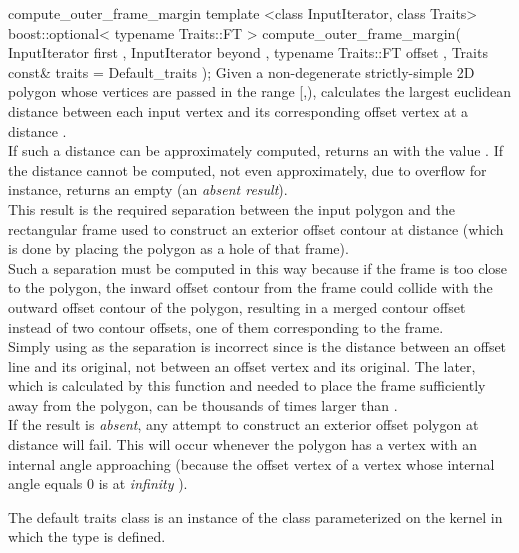 \begin{ccRefFunction}{compute_outer_frame_margin}
\ccFunction
{template <class InputIterator, class Traits>
boost::optional< typename Traits::FT >
compute_outer_frame_margin( InputIterator       first
                          , InputIterator       beyond
                          , typename Traits::FT offset
                          , Traits const&       traits = Default_traits
                          );
} 
{Given a non-degenerate strictly-simple 2D polygon whose vertices are passed 
in the range [,), calculates the largest euclidean distance
 between each input vertex and its corresponding offset vertex at
a distance .\\
If such a distance can be approximately computed, returns an  with the value . If the distance cannot be computed, not even approximately, due to overflow for instance, returns an empty  (an {\em absent result}).\\
This result is the required separation between the input polygon
and the rectangular frame used to construct an exterior offset contour
at distance  (which is done by placing the polygon as a hole of that frame).\\
Such a separation must be computed in this way because if the frame is 
too close to the polygon, the inward offset contour from the frame could
collide with the outward offset contour of the polygon, resulting in a merged
contour offset instead of two contour offsets, one of them corresponding to the frame.\\
Simply using  as the separation is incorrect since  is the distance 
between an offset line and its original, not between an offset vertex and its original.
The later, which is calculated by this function and needed to place the frame sufficiently
away from the polygon, can be thousands of times larger than .\\
If the result is {\em absent}, any attempt to construct an exterior offset polygon at distance  will fail. This will occur whenever the polygon has a vertex with an internal angle approaching  (because the offset vertex of a vertex whose internal angle equals 0 is at {\em infinity} ).\\
\ccPrecond{The range [\ccc{first},\ccc{beyond}) contains the vertices
of a non-degenerate strictly-simple 2D polygon.}
}

The default traits class  is an instance of the
class  parameterized on
the kernel in which the type  is defined.


\end{ccRefFunction}
